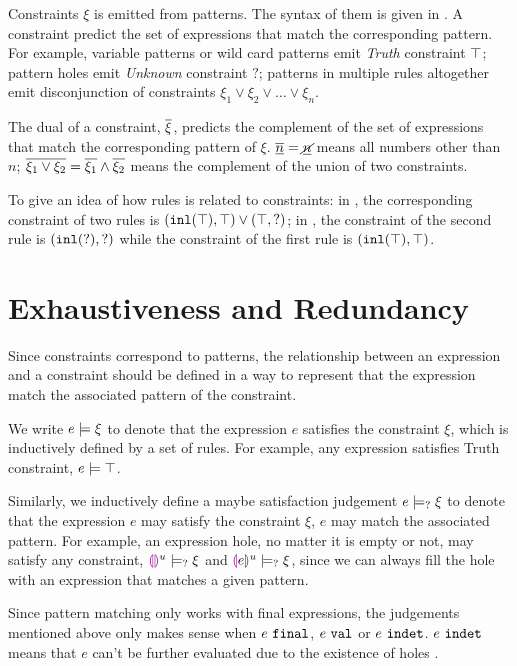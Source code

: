 \documentclass[acmsmall,screen,review,nonacm]{acmart}
\theoremstyle{slplain}
\numberwithin{thm}{section}
\begin{document}
Constraints $\xi$ is emitted from patterns. The syntax of them is given in . A constraint predict the set of expressions that match the corresponding pattern.
For example, variable patterns or wild card patterns emit \emph{Truth} constraint $\top$;
pattern holes emit \emph{Unknown} constraint $?$;
patterns in multiple rules altogether emit disconjunction of constraints $\xi_1 \vee \xi_2 \vee \dots \vee \xi_n$.

The dual of a constraint, $\overline{\xi}$, predicts the complement of the set of expressions that match the corresponding pattern of $\xi$.
\eg $\overline{\underline{n}}=\underline{\cancel{n}}$ means all numbers other than $n$;
$\overline{\xi_1 \vee \xi_2}=\overline{\xi_1} \wedge \overline{\xi_2}$ means the complement of the union of two constraints.

To give an idea of how rules is related to constraints:
in , the corresponding constraint of two rules is $(\mathtt{inl}(\top) , \top) \vee (\top , \mathtt{?})$;
in , the constraint of the second rule is $(\mathtt{inl}(\mathtt{?}) , \mathtt{?})$ while the constraint of the first rule is $(\mathtt{inl}(\top) , \top)$.




\section{Exhaustiveness and Redundancy}
\label{sec:exhaustiveness-redundancy}
Since constraints correspond to patterns, the relationship between an expression and a constraint should be defined in a way to represent that the expression match the associated pattern of the constraint.

We write $e \models \xi$ to denote that the expression $e$ satisfies the constraint $\xi$, which is inductively defined by a set of rules. For example, any expression satisfies Truth constraint, $e \models \top$.

Similarly, we inductively define a maybe satisfaction judgement $e \models_{?} \xi$ to denote that the expression $e$ may satisfy the constraint $\xi$, \ie $e$ may match the associated pattern. For example, an expression hole, no matter it is empty or not, may satisfy any constraint, \ie $\textcolor{violet}{\llparenthesis}\textcolor{violet}{\rrparenthesis}^{u} \models_{?} \xi$ and $\textcolor{violet}{\llparenthesis} e\textcolor{violet}{\rrparenthesis}^{u} \models_{?} \xi$, since we can always fill the hole with an expression that matches a given pattern.

Since pattern matching only works with final expressions, the judgements mentioned above only makes sense when $e ~\mathtt{final}$, \ie $e ~\mathtt{val}$ or $e ~\mathtt{indet}$. $e ~\mathtt{indet}$ means that $e$ can't be further evaluated due to the existence of holes \cite{DBLP:journals/pacmpl/OmarVCH19}.
\end{document}
